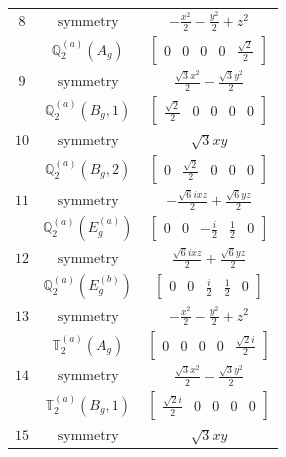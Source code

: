 \documentclass[fleqn,8pt,landscape]{jsarticle}
\begin{document}
\begin{longtable}{ccc}
$ 8 $ & $ \text{symmetry} $ & $ - \frac{x^{2}}{2} - \frac{y^{2}}{2} + z^{2} $ \\
$  $ & $ \mathbb{Q}_{2}^{(a)}(A_{g}) $ & $ \begin{bmatrix} 0 & 0 & 0 & 0 & \frac{\sqrt{2}}{2} \end{bmatrix} $ \\ \hline
$ 9 $ & $ \text{symmetry} $ & $ \frac{\sqrt{3} x^{2}}{2} - \frac{\sqrt{3} y^{2}}{2} $ \\
$  $ & $ \mathbb{Q}_{2}^{(a)}(B_{g},1) $ & $ \begin{bmatrix} \frac{\sqrt{2}}{2} & 0 & 0 & 0 & 0 \end{bmatrix} $ \\ \hline
$ 10 $ & $ \text{symmetry} $ & $ \sqrt{3} x y $ \\
$  $ & $ \mathbb{Q}_{2}^{(a)}(B_{g},2) $ & $ \begin{bmatrix} 0 & \frac{\sqrt{2}}{2} & 0 & 0 & 0 \end{bmatrix} $ \\ \hline
$ 11 $ & $ \text{symmetry} $ & $ - \frac{\sqrt{6} i x z}{2} + \frac{\sqrt{6} y z}{2} $ \\
$  $ & $ \mathbb{Q}_{2}^{(a)}(E_{g}^{(a)}) $ & $ \begin{bmatrix} 0 & 0 & - \frac{i}{2} & \frac{1}{2} & 0 \end{bmatrix} $ \\ \hline
$ 12 $ & $ \text{symmetry} $ & $ \frac{\sqrt{6} i x z}{2} + \frac{\sqrt{6} y z}{2} $ \\
$  $ & $ \mathbb{Q}_{2}^{(a)}(E_{g}^{(b)}) $ & $ \begin{bmatrix} 0 & 0 & \frac{i}{2} & \frac{1}{2} & 0 \end{bmatrix} $ \\ \hline
$ 13 $ & $ \text{symmetry} $ & $ - \frac{x^{2}}{2} - \frac{y^{2}}{2} + z^{2} $ \\
$  $ & $ \mathbb{T}_{2}^{(a)}(A_{g}) $ & $ \begin{bmatrix} 0 & 0 & 0 & 0 & \frac{\sqrt{2} i}{2} \end{bmatrix} $ \\ \hline
$ 14 $ & $ \text{symmetry} $ & $ \frac{\sqrt{3} x^{2}}{2} - \frac{\sqrt{3} y^{2}}{2} $ \\
$  $ & $ \mathbb{T}_{2}^{(a)}(B_{g},1) $ & $ \begin{bmatrix} \frac{\sqrt{2} i}{2} & 0 & 0 & 0 & 0 \end{bmatrix} $ \\ \hline
$ 15 $ & $ \text{symmetry} $ & $ \sqrt{3} x y $ \\

\end{longtable}
\end{document}
